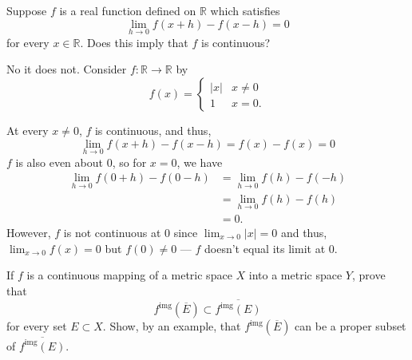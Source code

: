 \documentclass[12 pt, letterpaper]{hmcpset}
\begin{document}
\pagebreak

\begin{problem}
	Suppose $f$ is a real function defined on $\mathbb{R}$ which satisfies
	\[
		\lim_{h \to 0} f(x + h) - f(x - h) = 0
	\]
	for every $x \in \mathbb{R}$. Does this imply that $f$ is continuous?
\end{problem}

\begin{solution}
	No it does not. Consider $f : \mathbb{R} \to \mathbb{R}$ by
	\[
		f(x) = \begin{cases}
			\lvert x \rvert & x \neq 0 \\
			1 & x = 0.
		\end{cases}
	\]

	At every $x \neq 0$, $f$ is continuous, and thus,
	\[
		\lim_{h \to 0} f(x + h) - f(x - h) = f(x) - f(x) = 0
	\]
	$f$ is also even about $0$, so for $x = 0$, we have
	\[
		\begin{split}
			\lim_{h \to 0} f(0 + h) - f(0 - h) & = \lim_{h \to 0} f(h) - f(-h) \\
							   & = \lim_{h \to 0} f(h) - f(h) \\
							   & = 0.
		\end{split}
	\]
	However, $f$ is not continuous at $0$ since $\lim_{x \to 0} \lvert x \rvert = 0$ and thus, $\lim_{x \to 0} f(x) = 0$ but $f(0) \neq 0$ --- $f$ doesn't equal its limit at $0$.
\end{solution}

\pagebreak

\begin{problem}
	If $f$ is a continuous mapping of a metric space $X$ into a metric space $Y$, prove that
	\[
		f^{\text{img}}(\overline{E}) \subset \overline{f^{\text{img}}(E)}
	\]
	for every set $E \subset X$. Show, by an example, that $f^{\text{img}}(\overline{E})$ can be a proper subset of $\overline{f^{\text{img}}(E)}$.
\end{problem}
\end{document}
